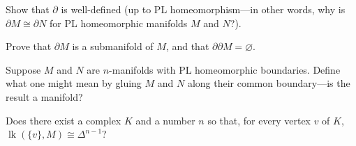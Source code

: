 \documentclass[12pt]{pset}
\newcommand{\boundary}{\partial}
\DeclareMathOperator{\lk}{lk}
\begin{document}
\begin{problem}
  Show that $\boundary$ is well-defined (up to PL homeomorphism---in
  other words, why is $\boundary M \cong \boundary N$ for PL
  homeomorphic manifolds $M$ and $N$?).
\end{problem}

\begin{problem}
Prove that $\boundary M$ is a submanifold of $M$, and that $\boundary \boundary M = \varnothing$.
\end{problem}
\begin{problem}
  Suppose $M$ and $N$ are $n$-manifolds with PL homeomorphic
  boundaries.  Define what one might mean by gluing $M$ and $N$ along
  their common boundary---is the result a manifold?
\end{problem}

\begin{problem}
  Does there exist a complex $K$ and a number $n$ so that, for every vertex $v$ of $K$, $\lk(\{v\}, M) \cong \Delta^{n-1}$?
\end{problem}
\end{document}
